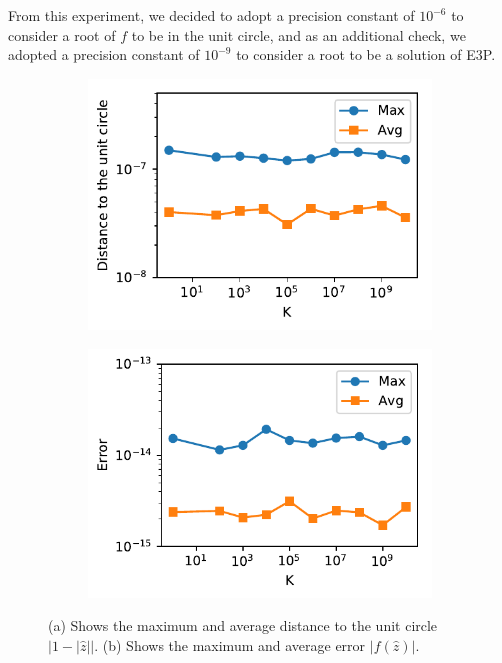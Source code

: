 From this experiment, we decided to adopt a precision constant of $10^{-6}$ to consider a root of $f$ to be in the unit circle, and as an additional check, we adopted a precision constant of $10^{-9}$ to consider a root to be a solution of E3P.

\begin{figure}[!htb]
	
	\begin{subfigure}{.5\textwidth}
		\centering

		\includegraphics[scale=.8]{figures/e3p_known_sols2}
		\caption{}
		\label{fig:e3p_known_sols2}
	\end{subfigure}
	\begin{subfigure}{.5\textwidth}
	\centering
	
	\includegraphics[scale=.8]{figures/e3p_known_sols1}
	\caption{}
	\label{fig:e3p_known_sols1}
	\end{subfigure}
\caption{(a) Shows the maximum and average distance to the unit circle $|1-|\hat{z}||$. (b) Shows the maximum and average error $|f(\hat{z})|$.}
\end{figure}

